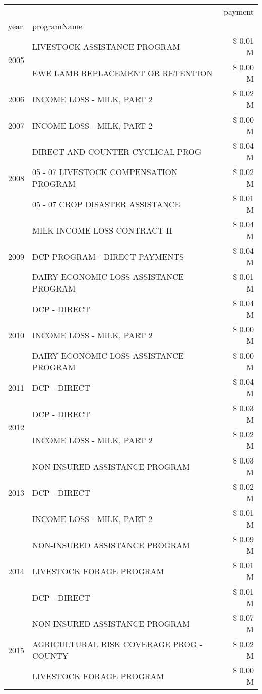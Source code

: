 \begin{tabular}{llr}
\toprule
 &  & payment \\
year & programName &  \\
\midrule
\multirow[t]{2}{*}{2005} & LIVESTOCK ASSISTANCE PROGRAM & \$ 0.01 M \\
 & EWE LAMB REPLACEMENT OR RETENTION & \$ 0.00 M \\
\cline{1-3}
2006 & INCOME LOSS - MILK, PART 2 & \$ 0.02 M \\
\cline{1-3}
2007 & INCOME LOSS - MILK, PART 2 & \$ 0.00 M \\
\cline{1-3}
\multirow[t]{3}{*}{2008} & DIRECT AND COUNTER CYCLICAL PROG & \$ 0.04 M \\
 & 05 - 07 LIVESTOCK COMPENSATION PROGRAM & \$ 0.02 M \\
 & 05 - 07 CROP DISASTER ASSISTANCE & \$ 0.01 M \\
\cline{1-3}
\multirow[t]{3}{*}{2009} & MILK INCOME LOSS CONTRACT II & \$ 0.04 M \\
 & DCP PROGRAM - DIRECT PAYMENTS & \$ 0.04 M \\
 & DAIRY ECONOMIC LOSS ASSISTANCE PROGRAM & \$ 0.01 M \\
\cline{1-3}
\multirow[t]{3}{*}{2010} & DCP - DIRECT & \$ 0.04 M \\
 & INCOME LOSS - MILK, PART 2 & \$ 0.00 M \\
 & DAIRY ECONOMIC LOSS ASSISTANCE PROGRAM & \$ 0.00 M \\
\cline{1-3}
2011 & DCP - DIRECT & \$ 0.04 M \\
\cline{1-3}
\multirow[t]{2}{*}{2012} & DCP - DIRECT & \$ 0.03 M \\
 & INCOME LOSS - MILK, PART 2 & \$ 0.02 M \\
\cline{1-3}
\multirow[t]{3}{*}{2013} & NON-INSURED ASSISTANCE PROGRAM & \$ 0.03 M \\
 & DCP - DIRECT & \$ 0.02 M \\
 & INCOME LOSS - MILK, PART 2 & \$ 0.01 M \\
\cline{1-3}
\multirow[t]{3}{*}{2014} & NON-INSURED ASSISTANCE PROGRAM & \$ 0.09 M \\
 & LIVESTOCK FORAGE PROGRAM & \$ 0.01 M \\
 & DCP - DIRECT & \$ 0.01 M \\
\cline{1-3}
\multirow[t]{3}{*}{2015} & NON-INSURED ASSISTANCE PROGRAM & \$ 0.07 M \\
 & AGRICULTURAL RISK COVERAGE PROG - COUNTY & \$ 0.02 M \\
 & LIVESTOCK FORAGE PROGRAM & \$ 0.00 M \\

\end{tabular}

